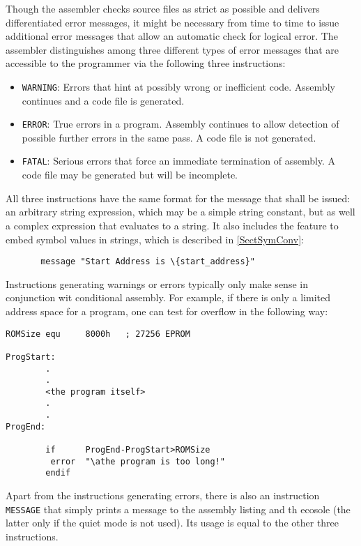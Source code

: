 \documentclass[12pt,twoside]{report}
\newcommand{\tty}[1]{{\tt #1}}
\begin{document}
Though the assembler checks source files as strict as possible and
delivers differentiated error messages, it might be necessary from
time to time to issue additional error messages that allow an
automatic check for logical error.  The assembler distinguishes
among three different types of error messages that are accessible to
the programmer via the following three instructions:
\begin{itemize}
\item{\tty{WARNING}: Errors that hint at possibly wrong or inefficient
      code.  Assembly continues and a code file is generated.}
\item{\tty{ERROR}: True errors in a program.  Assembly continues to
      allow detection of possible further errors in the same pass.
      A code file is not generated.}
\item{\tty{FATAL}: Serious errors that force an immediate termination
      of assembly.  A code file may be generated but will be incomplete.}
\end{itemize}
All three instructions have the same format for the message that shall
be issued: an arbitrary string expression, which may be a simple string
constant, but as well a complex expression that evaluates to a string.
It also includes the feature to embed symbol values in strings, which
is described in \ref{SectSymConv}:
\begin{verbatim}
       message "Start Address is \{start_address}"
\end{verbatim}
Instructions generating warnings or errors typically only make sense
in conjunction wit conditional assembly.  For example, if there is
only a limited address space for a program, one can test for overflow
in the following way:
\begin{verbatim}
ROMSize equ     8000h   ; 27256 EPROM

ProgStart:
        .
        .
        <the program itself>
        .
        .
ProgEnd:

        if      ProgEnd-ProgStart>ROMSize
         error  "\athe program is too long!"
        endif
\end{verbatim}
Apart from the instructions generating errors, there is also an
instruction \tty{MESSAGE} that simply prints a message to the assembly
listing and th ecosole (the latter only if the quiet mode is not used).
Its usage is equal to the other three instructions.

\end{document}
